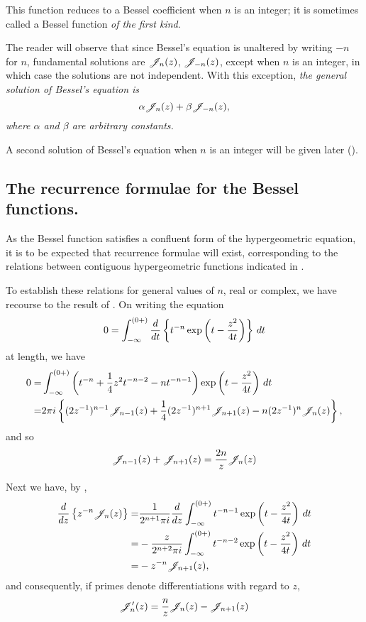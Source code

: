 \documentclass{book}
\begin{document}
This function reduces to a Bessel coefficient when $n$ is an integer;
it is sometimes called a Bessel function \emph{of the first kind}.

The reader will observe that since Bessel's equation is unaltered by
writing $-n$ for $n$, fundamental solutions are $\mathscr{J}_n(z)$, $\mathscr{J}_{-n}(z)$,
except when $n$ is an integer, in which case the solutions are not
independent. With this exception, \emph{the general solution of
  Bessel's equation is
$$
\alpha \mathscr{J}_n(z) + \beta \mathscr{J}_{-n}(z),
$$
where $\alpha$ and $\beta$ are arbitrary constants.}

A second solution of Bessel's equation when $n$ is an integer will be
given later ().

\subsection{The recurrence formulae for the Bessel functions.}
As the Bessel function satisfies a confluent form of the
hypergeometric equation, it is to be expected that recurrence formulae
will exist, corresponding to the relations between contiguous
hypergeometric functions indicated in .

To establish these relations for general values of $n$, real or
complex, we have recourse to the result of .
On writing the equation
$$
0 = \int_{-\infty}^{(0+)} \frac{d}{dt} \left\{  t^{-n}
  \exp\left(  t - \frac{z^2}{4t}   \right)   \right\} \, d t
$$
at length, we have
\begin{align*}
0 =& \int_{-\infty}^{(0+)}
\theparen{ t^{-n} + \frac{1}{4}z^2 t^{-n-2} - nt^{-n-1}  }
  \exp\theparen{ t - \frac{z^2}{4t}  }  \dmeasure t \\
%
  =& 2\pi i
  \thebrace{ (2z^{-1})^{n-1} \besJ_{n-1}(z)
    + \frac{1}{4} (2z^{-1})^{n+1} \besJ_{n+1}(z)
  - n (2z^{-1})^n \besJ_n(z)},
\end{align*}
and so
\begin{equation}
\mathscr{J}_{n-1}(z) + \mathscr{J}_{n+1}(z) = \frac{2n}{z} \mathscr{J}_n(z) 
\label{eq:bessel:recur}
\end{equation}

Next we have, by ,
\begin{align*}
  \frac{d}{dz} \left\{  z^{-n} \mathscr{J}_n(z)   \right\}
  =& \frac{1}{2^{n+1}\pi i}
  \frac{d}{dz}
  \int_{-\infty}^{(0+)}
  t^{-n-1}
  \exp\left(  t - \frac{z^2}{4t}  \right)
  \, d t
  \\
  =& - \frac{z}{2^{n+2}\pi i}
  \int_{-\infty}^{(0+)}
  t^{-n-2}
  \exp\left(  t - \frac{z^2}{4t}  \right)
  \, d t
  \\
  =& -z^{-n} \mathscr{J}_{n+1}(z),  
\end{align*}
%
%
and consequently, if primes denote differentiations with regard to
$z$,
\begin{equation}
  \mathscr{J}'_n(z) = \frac{n}{z} \mathscr{J}_n(z) - \mathscr{J}_{n+1}(z)
\label{eq:bessel:deriv}
\end{equation}
\end{document}
